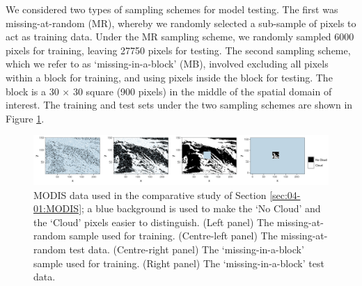 \documentclass[nojss]{jss}
\begin{document}
We considered two types of sampling schemes for model testing.
 The first was missing-at-random (MR), whereby we randomly selected a sub-sample of pixels to act as training data.
 Under the MR sampling scheme, we randomly sampled 6000 pixels for training, leaving 27750 pixels for testing. 
 The second sampling scheme, which we refer to as `missing-in-a-block' (MB), involved excluding all pixels within a block for training, and using pixels inside the block for testing. 
 The block is a 30 $\times$ 30 square (900 pixels) in the middle of the spatial domain of interest. 
The training and test sets under the two sampling schemes are shown in Figure \ref{fig:03-04-Modis1}.
\begin{figure}[t!]
    \centering
    \includegraphics[width = \linewidth]{img/MODIS_data.png}
     \caption{
     MODIS data used in the comparative study of Section \ref{sec:04-01:MODIS}; a blue background is used to make the `No Cloud' and the `Cloud' pixels easier to distinguish. (Left panel) The missing-at-random sample used for training.  (Centre-left panel) The missing-at-random test data. (Centre-right panel) The `missing-in-a-block' sample used for training. (Right panel) The `missing-in-a-block' test data. 
     }\label{fig:03-04-Modis1}
\end{figure}
\end{document}

